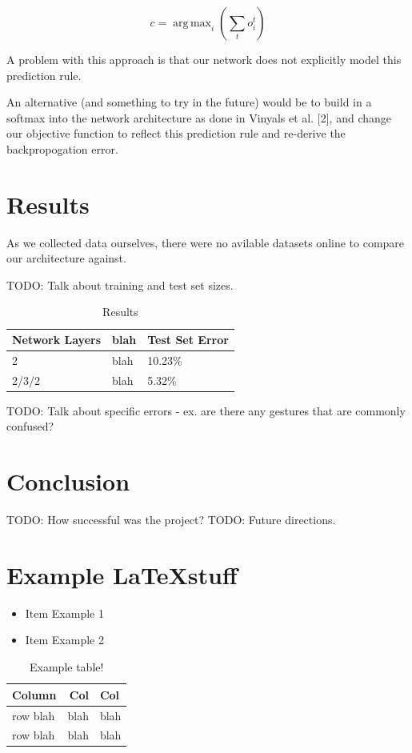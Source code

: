 \documentclass[11pt]{article}
\DeclareMathOperator*{\argmax}{arg\,max}
\begin{document}
\[ c = \argmax_{i}(\sum_{t} o_{i}^{t}) \]

A problem with this approach is that our network does not
explicitly model this prediction rule. 

An alternative (and something to try in the future) would
be to build in a softmax into the network architecture as done
in Vinyals et al. [2], and change our objective function to reflect
this prediction rule and re-derive the backpropogation error.

\section{Results}

As we collected data ourselves, there were no avilable datasets
online to compare our architecture against.

TODO: Talk about training and test set sizes.

\begin{table}[h]
\begin{center}
\begin{tabular}{|l|l|l|}
\hline \bf Network Layers & \bf blah & \bf Test Set Error \\ \hline
2 & blah & 10.23\% \\
2/3/2 & blah & 5.32\% \\
\hline
\end{tabular}
\end{center}
\caption{\label{font-table} Results }
\end{table}

TODO: Talk about specific errors - ex. are there any gestures
that are commonly confused?

\section{Conclusion}

TODO: How successful was the project?
TODO: Future directions.


\section{Example \LaTeX stuff}
\begin{itemize}
\item Item Example 1
\item Item Example 2
\end{itemize}

\begin{table}[h]
\begin{center}
\begin{tabular}{|l|rl|}
\hline \bf Column & \bf Col & \bf Col \\ \hline
row blah & blah & blah \\
row blah & blah & blah \\
\hline
\end{tabular}
\end{center}
\caption{\label{font-table} Example table! }
\end{table}
\end{document}
